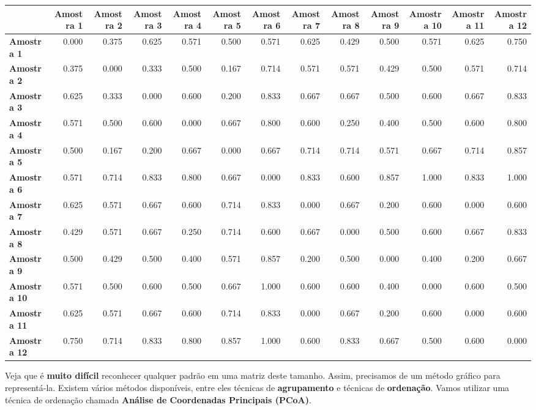 \documentclass[
]{book}
\begin{document}
\begin{table}
\centering\begingroup\fontsize{9}{11}\selectfont

\begin{tabular}{>{}l|r|r|r|r|r|r|r|r|r|r|r|r}
\hline
  & Amostra 1 & Amostra 2 & Amostra 3 & Amostra 4 & Amostra 5 & Amostra 6 & Amostra 7 & Amostra 8 & Amostra 9 & Amostra 10 & Amostra 11 & Amostra 12\\
\hline
\textbf{Amostra 1} & 0.000 & 0.375 & 0.625 & 0.571 & 0.500 & 0.571 & 0.625 & 0.429 & 0.500 & 0.571 & 0.625 & 0.750\\
\hline
\textbf{Amostra 2} & 0.375 & 0.000 & 0.333 & 0.500 & 0.167 & 0.714 & 0.571 & 0.571 & 0.429 & 0.500 & 0.571 & 0.714\\
\hline
\textbf{Amostra 3} & 0.625 & 0.333 & 0.000 & 0.600 & 0.200 & 0.833 & 0.667 & 0.667 & 0.500 & 0.600 & 0.667 & 0.833\\
\hline
\textbf{Amostra 4} & 0.571 & 0.500 & 0.600 & 0.000 & 0.667 & 0.800 & 0.600 & 0.250 & 0.400 & 0.500 & 0.600 & 0.800\\
\hline
\textbf{Amostra 5} & 0.500 & 0.167 & 0.200 & 0.667 & 0.000 & 0.667 & 0.714 & 0.714 & 0.571 & 0.667 & 0.714 & 0.857\\
\hline
\textbf{Amostra 6} & 0.571 & 0.714 & 0.833 & 0.800 & 0.667 & 0.000 & 0.833 & 0.600 & 0.857 & 1.000 & 0.833 & 1.000\\
\hline
\textbf{Amostra 7} & 0.625 & 0.571 & 0.667 & 0.600 & 0.714 & 0.833 & 0.000 & 0.667 & 0.200 & 0.600 & 0.000 & 0.600\\
\hline
\textbf{Amostra 8} & 0.429 & 0.571 & 0.667 & 0.250 & 0.714 & 0.600 & 0.667 & 0.000 & 0.500 & 0.600 & 0.667 & 0.833\\
\hline
\textbf{Amostra 9} & 0.500 & 0.429 & 0.500 & 0.400 & 0.571 & 0.857 & 0.200 & 0.500 & 0.000 & 0.400 & 0.200 & 0.667\\
\hline
\textbf{Amostra 10} & 0.571 & 0.500 & 0.600 & 0.500 & 0.667 & 1.000 & 0.600 & 0.600 & 0.400 & 0.000 & 0.600 & 0.500\\
\hline
\textbf{Amostra 11} & 0.625 & 0.571 & 0.667 & 0.600 & 0.714 & 0.833 & 0.000 & 0.667 & 0.200 & 0.600 & 0.000 & 0.600\\
\hline
\textbf{Amostra 12} & 0.750 & 0.714 & 0.833 & 0.800 & 0.857 & 1.000 & 0.600 & 0.833 & 0.667 & 0.500 & 0.600 & 0.000\\
\hline
\end{tabular}
\endgroup{}
\end{table}

Veja que é \textbf{muito difícil} reconhecer qualquer padrão em uma matriz deste tamanho. Assim, precisamos de um método gráfico para representá-la. Existem vários métodos disponíveis, entre eles técnicas de \textbf{agrupamento} e técnicas de \textbf{ordenação}. Vamos utilizar uma técnica de ordenação chamada \textbf{Análise de Coordenadas Principais (PCoA)}.
\end{document}
